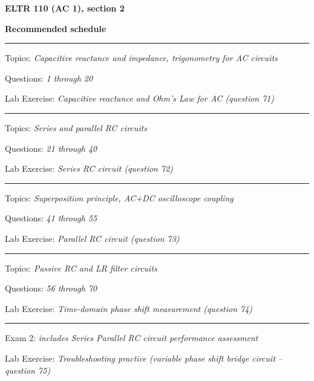 
\centerline{\bf ELTR 110 (AC 1), section 2} \bigskip 
 
\vskip 10pt

\noindent
{\bf Recommended schedule}

\vskip 5pt

\hrule \vskip 5pt
\noindent
{}

\hskip 10pt Topics: {\it Capacitive reactance and impedance, trigonometry for AC circuits}
 
\hskip 10pt Questions: {\it 1 through 20}
 
\hskip 10pt Lab Exercise: {\it Capacitive reactance and Ohm's Law for AC (question 71)}
 
\vskip 10pt
\hrule \vskip 5pt
\noindent
{}

\hskip 10pt Topics: {\it Series and parallel RC circuits}
 
\hskip 10pt Questions: {\it 21 through 40}
 
\hskip 10pt Lab Exercise: {\it Series RC circuit (question 72)}
 
\vskip 10pt
\hrule \vskip 5pt
\noindent
{}

\hskip 10pt Topics: {\it Superposition principle, AC+DC oscilloscope coupling}
 
\hskip 10pt Questions: {\it 41 through 55}
 
\hskip 10pt Lab Exercise: {\it Parallel RC circuit (question 73)}
 

\vskip 10pt
\hrule \vskip 5pt
\noindent
{}

\hskip 10pt Topics: {\it Passive RC and LR filter circuits}
 
\hskip 10pt Questions: {\it 56 through 70}
 
\hskip 10pt Lab Exercise: {\it Time-domain phase shift measurement (question 74)}
 

\vskip 10pt
\hrule \vskip 5pt
\noindent
{}

\hskip 10pt Exam 2: {\it includes Series  Parallel RC circuit performance assessment}
 
\hskip 10pt Lab Exercise: {\it Troubleshooting practice (variable phase shift bridge circuit -- question 75)}
  
